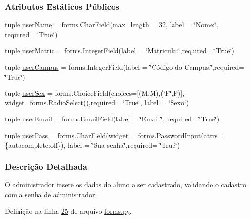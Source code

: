 \subsubsection*{Atributos Estáticos Públicos}
\begin{DoxyCompactItemize}
\item 
tuple \hyperlink{classAdm_1_1forms_1_1AdmRegStu__ProfForm_a4e5391112a173e2d304e20c2cc8bca4d}{user\+Name} = forms.\+Char\+Field(max\+\_\+length = 32, label = \char`\"{}Nome\+:\char`\"{}, required= \char`\"{}True\char`\"{})
\item 
tuple \hyperlink{classAdm_1_1forms_1_1AdmRegStu__ProfForm_a8cd50b9437effd2fecd6e4c66c307e41}{user\+Matric} = forms.\+Integer\+Field(label = \char`\"{}Matricula\+:\char`\"{},required= \char`\"{}True\char`\"{})
\item 
tuple \hyperlink{classAdm_1_1forms_1_1AdmRegStu__ProfForm_a885786ae8be597f051f8e3ff65ddb02d}{user\+Campus} = forms.\+Integer\+Field(label = \char`\"{}Código do Campus\+:\char`\"{},required= \char`\"{}True\char`\"{})
\item 
tuple \hyperlink{classAdm_1_1forms_1_1AdmRegStu__ProfForm_af8e16ffbc31dfdec8496b7751bb51bed}{user\+Sex} = forms.\+Choice\+Field(choices=\mbox{[}(\textquotesingle{}M\textquotesingle{},\textquotesingle{}M\textquotesingle{}),(\char`\"{}F\char`\"{},\textquotesingle{}F\textquotesingle{})\mbox{]}, widget=forms.\+Radio\+Select(),required= \char`\"{}True\char`\"{}, label = \char`\"{}Sexo\char`\"{})
\item 
tuple \hyperlink{classAdm_1_1forms_1_1AdmRegStu__ProfForm_a97ccca87a1c1c3a223e13d51e8196ef4}{user\+Email} = forms.\+Email\+Field(label = \char`\"{}Email\+:\char`\"{}, required= \char`\"{}True\char`\"{})
\item 
tuple \hyperlink{classAdm_1_1forms_1_1AdmRegStu__ProfForm_ad50fce73918c911541bd1c385d25eeca}{user\+Pass} = forms.\+Char\+Field(widget = forms.\+Password\+Input(attrs=\{\textquotesingle{}autocomplete\textquotesingle{}\+:\textquotesingle{}off\textquotesingle{}\}), label = \char`\"{}Sua senha\char`\"{},required= \char`\"{}True\char`\"{})
\end{DoxyCompactItemize}


\subsubsection{Descrição Detalhada}
O administrador insere os dados do aluno a ser cadastrado, validando o cadastro com a senha de administrador. 

Definição na linha \hyperlink{Adm_2forms_8py_source_l00025}{25} do arquivo \hyperlink{Adm_2forms_8py_source}{forms.\+py}.



